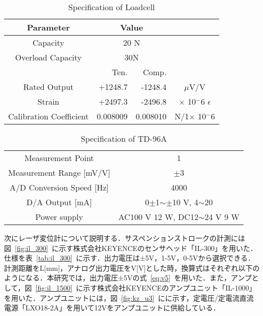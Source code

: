 \documentclass[a4paper,12pt]{article_vdlab_sotsuron}
\begin{document}
\vspace*{10mm}
\begin{table}[h]
  \begin{center}
    \caption{Specification of Loadcell}
	\label{tab:tclz}
	\begin{tabular}{crrc}\hline
	  Parameter & \multicolumn{2}{c}{Value}&\\\hline
	  Capacity & \multicolumn{2}{c}{20 N}&\\
	  Overload Capacity & \multicolumn{2}{c}{30N}&\\
	    & Ten.&Comp.\\
	  Rated Output & +1248.7 & -1248.4 & $\mu$V/V \\
	  Strain & +2497.3 & -2496.8 & $\times$ 10$^-6$ $\epsilon$ \\
	  Calibration Coefficient & 0.008009 & 0.008010 & N/1$\times$ 10$^-6$ \\\hline
	\end{tabular}
  \end{center}
\end{table}

\vspace*{10mm}
\begin{table}[h]
  \begin{center}
    \caption{Specification of TD-96A}
    \label{tab:td_96a}
    \begin{tabular}{cc}\hline
      Measurement Point & 1 \\
      Measurement Range [mV/V]& $\pm$3\\
      A/D Conversion Speed [Hz]& 4000\\
      D/A Output [mA]& 0$\pm$1$\sim\pm$10 V, 4$\sim$20\\
      Power supply & AC100 V 12 W, DC12$\sim$24 V 9 W \\\hline
    \end{tabular}
  \end{center}
\end{table}
\newpage
  次にレーザ変位計について説明する．サスペンションストロークの計測には図~\ref{fig:il_300}~に示す株式会社KEYENCEのセンサヘッド「IL-300」を用いた．仕様を表~\ref{tab:il_300}~に示す．出力電圧は±5V，1-5V，0-5Vから選択できる．計測距離をL[mm]，アナログ出力電圧をV[V]とした時，換算式はそれぞれ以下のようになる．本研究では，出力電圧±5Vの式~\ref{eq:v5}~を用いた．また，アンプとして，図~\ref{fig:il_1500}~に示す株式会社KEYENCEのアンプユニット「IL-1000」を用いた．アンプユニットには，図~\ref{fig:kz_u3}~にに示す，定電圧/定電流直流電源「LXO18-2A」を用いて12Vをアンプユニットに供給している．
\end{document}
